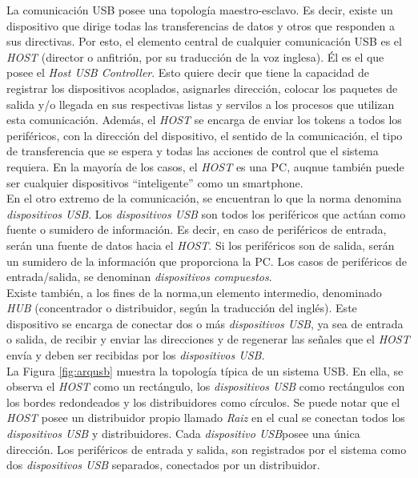 	La comunicación USB posee una topología maestro-esclavo. Es decir, existe un dispositivo que dirige todas las transferencias de datos y otros que responden a sus directivas. Por esto, el elemento central de cualquier comunicación USB es el {\it HOST} (director o anfitrión, por su traducción de la voz inglesa). Él es el que posee el {\it Host USB Controller}\cite{USBspec}. Esto quiere decir que tiene la capacidad de registrar los dispositivos acoplados, asignarles dirección, colocar los paquetes de salida y/o llegada en sus respectivas listas y servilos a los procesos que utilizan esta comunicación. Además, el {\it HOST} se encarga de enviar los tokens a todos los periféricos, con la dirección del dispositivo, el sentido de la comunicación, el tipo de transferencia que se espera y todas las acciones de control que el sistema requiera. En la mayoría de los casos, el {\it HOST} es una PC, auqnue también puede ser cualquier dispositivos  ``inteligente'' como un smartphone.\\
	
	En el otro extremo de la comunicación, se encuentran lo que la norma denomina {\it dispositivos USB}\cite{USBspec}. Los {\it dispositivos USB} son todos los periféricos que actúan como fuente o sumidero de información. Es decir, en caso de periféricos de entrada, serán una fuente de datos hacia el {\it HOST}. Si los periféricos son de salida, serán un sumidero de la información que proporciona la PC. Los casos de periféricos de entrada/salida, se denominan {\it dispositivos compuestos}.\\
		
	Existe también, a los fines de la norma,un elemento intermedio, denominado {\it HUB} (concentrador o distribuidor, según la traducción del inglés). Este dispositivo se encarga de conectar dos o más {\it dispositivos USB}, ya sea de entrada o salida, de recibir y enviar las direcciones y de regenerar las señales que el {\it HOST} envía y deben ser recibidas por los {\it dispositivos USB}.\\
	
	La Figura \ref{fig:arqusb} muestra la topología típica de un sistema USB. En ella, se observa el {\it HOST} como un rectángulo, los {\it dispositivos USB} como rectángulos con los bordes redondeados y los distribuidores como círculos. Se puede notar que el {\it HOST} posee un distribuidor propio llamado {\it Raiz} en el cual se conectan todos los {\it dispositivos USB } y distribuidores. Cada {\it dispositivo USB}posee una única dirección. Los periféricos de entrada y salida, son registrados por el sistema como dos {\it dispositivos USB} separados, conectados por un distribuidor.
	
